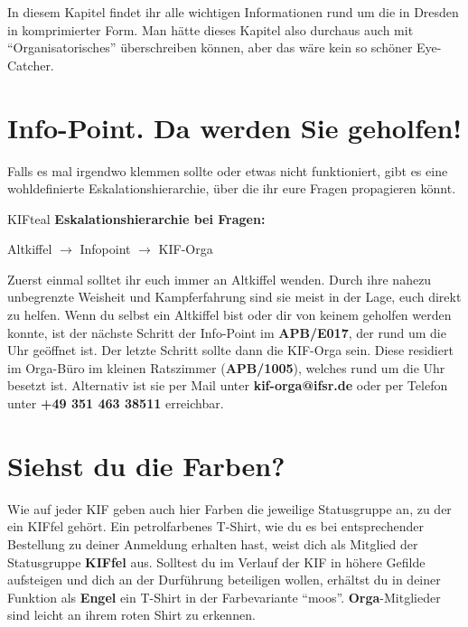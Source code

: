
In diesem Kapitel findet ihr alle wichtigen Informationen rund um die \KIF{} in Dresden in komprimierter Form.
Man hätte dieses Kapitel also durchaus auch mit ``Organisatorisches'' überschreiben können, aber das wäre kein so schöner Eye-Catcher.

\section*{Info-Point. Da werden Sie geholfen!}

Falls es mal irgendwo klemmen sollte oder etwas nicht funktioniert, gibt es eine wohldefinierte Eskalationshierarchie, über die ihr eure Fragen propagieren könnt.

\begin{awesomeblock}[KIFteal]{2pt}{\faQuestion}{KIFteal}
    \textbf{Eskalationshierarchie bei Fragen:}

  Altkiffel $\longrightarrow$ Infopoint $\longrightarrow$ KIF-Orga
\end{awesomeblock}

Zuerst einmal solltet ihr euch immer an Altkiffel wenden.
Durch ihre nahezu unbegrenzte Weisheit und Kampferfahrung sind sie meist in der Lage, euch direkt zu helfen.
Wenn du selbst ein Altkiffel bist oder dir von keinem geholfen werden konnte, ist der nächste Schritt der Info-Point im \textbf{APB/E017}, der rund um die Uhr geöffnet ist.
Der letzte Schritt sollte dann die KIF-Orga sein.
Diese residiert im Orga-Büro im kleinen Ratszimmer (\textbf{APB/1005}), welches rund um die Uhr besetzt ist.
Alternativ ist sie per Mail unter \textbf{kif-orga@ifsr.de} oder per Telefon unter \textbf{+49 351 463 38511} erreichbar.

\section*{Siehst du die Farben?}

Wie auf jeder KIF geben auch hier Farben die jeweilige Statusgruppe an, zu der ein KIFfel gehört.
Ein petrolfarbenes T-Shirt, wie du es bei entsprechender Bestellung zu deiner Anmeldung erhalten hast, weist dich als Mitglied der Statusgruppe \textbf{KIFfel} aus.
Solltest du im Verlauf der KIF in höhere Gefilde aufsteigen und dich an der Durführung beteiligen wollen, erhältst du in deiner Funktion als \textbf{Engel} ein T-Shirt in der Farbevariante \enquote{moos}.
\textbf{Orga}-Mitglieder sind leicht an ihrem roten Shirt zu erkennen.


